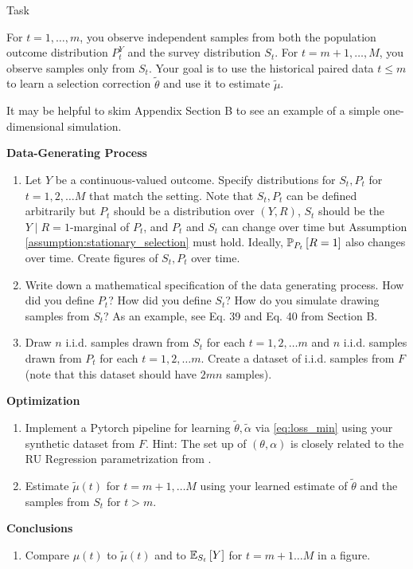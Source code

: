 \documentclass{article}
\theoremstyle{definition}
\theoremstyle{plain}
\theoremstyle{remark}
\begin{document}
\begin{section}{Task}

For $t=1,\ldots,m$, you observe independent samples from both the population outcome distribution $P_t^Y$ and the survey distribution $S_t$. For $t=m+1,\dots,M$, you observe samples only from $S_{t}$. Your goal is to use the historical paired data $t\leq m$ to learn a selection correction $\tilde{\theta}$ and use it to estimate $\tilde{\mu}$.

It may be helpful to skim \citet{sahoo2022learning} Appendix Section B to see an example of a simple one-dimensional simulation. 


\noindent\textbf{Data-Generating Process}
\begin{enumerate}
  \item  Let $Y$ be a continuous-valued outcome. Specify distributions for $S_{t}, P_{t}$ for $t=1, 2, \dots M$ that match the setting. Note that $S_{t}, P_{t}$ can be defined arbitrarily but $P_{t}$ should be a distribution over $(Y, R)$, $S_{t}$ should be the $Y \mid R=1$-marginal of $P_{t}$, and $P_{t}$ and $S_{t}$ can change over time but Assumption \ref{assumption:stationary_selection} must hold. Ideally, $\PP[P_{t}]{R=1}$ also changes over time. Create figures of $S_{t}, P_{t}$ over time. 
  \item Write down a mathematical specification of the data generating process. How did you define $P_{t}$? How did you define $S_{t}$? How do you simulate drawing samples from $S_{t}$? As an example, see Eq. 39 and Eq. 40 from \citet{sahoo2022learning} Section B.
  \item Draw $n$ i.i.d. samples drawn from $S_{t}$ for each $t=1, 2, \dots m$ and $n$ i.i.d. samples drawn from $P_{t}$ for each $t=1, 2, \dots m.$ Create a dataset of i.i.d. samples from $F$ (note that this dataset should have $2mn$ samples).
\end{enumerate}

\noindent\textbf{Optimization}
\begin{enumerate}
  \item Implement a Pytorch pipeline for learning $\tilde{\theta}, \tilde{\alpha}$ via \eqref{eq:loss_min} using your synthetic dataset from $F$. Hint: The set up of $(\theta, \alpha)$ is closely related to the RU Regression parametrization from \citet{sahoo2022learning}.
  \item Estimate $\tilde{\mu}(t)$ for $t=m+1, \dots M$ using your learned estimate of $\tilde{\theta}$ and the samples from $S_{t}$ for $t > m$.
\end{enumerate}

\noindent\textbf{Conclusions}
\begin{enumerate}
  \item Compare $\mu(t)$ to $\tilde{\mu}(t)$ and to $\EE[S_{t}]{Y}$ for $t= m+1 \dots M$ in a figure.
\end{enumerate}

\end{section}
\end{document}

